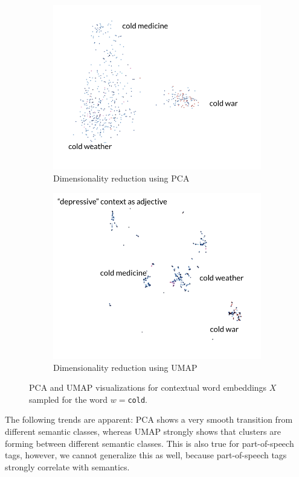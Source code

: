 \documentclass[a4paper,12pt,oneside,openright]{report}
\begin{document}
\begin{figure}
\begin{subfigure}{.45\textwidth}
  \centering
  \includegraphics[width=.8\linewidth]{./assets/analysis/cold_pca.png}
  \caption{Dimensionality reduction using PCA}
  \label{fig:sfig1}
\end{subfigure}%
\hfill
\begin{subfigure}{.45\textwidth}
  \centering
  \includegraphics[width=.8\linewidth]{./assets/analysis/cold_umap.png}
  \caption{Dimensionality reduction using UMAP}
  \label{fig:sfig2}
\end{subfigure}
\caption{PCA and UMAP visualizations for contextual word embeddings $X$ sampled for the word $w=$\texttt{cold}. }
\label{fig:cold_tensorboard}
\end{figure}

The following trends are apparent: 
PCA shows a very smooth transition from different semantic classes, whereas UMAP strongly shows that clusters are forming between different semantic classes.
This is also true for part-of-speech tags, however, we cannot generalize this as well, because part-of-speech tags strongly correlate with semantics.
\end{document}
